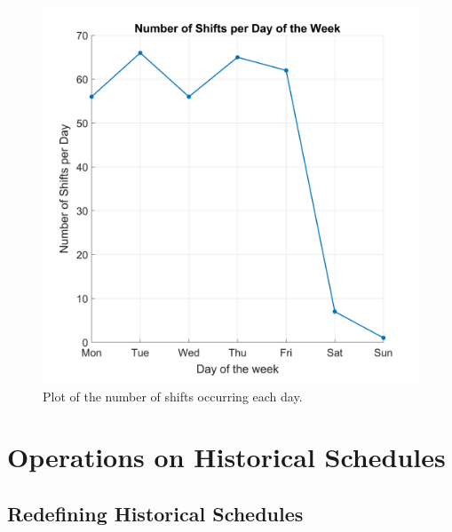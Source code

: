 

\begin{figure}[ht]
\begin{center}
\includegraphics[width=0.46\linewidth]{appendix/shift per day.png}
    
\end{center}
   \caption{Plot of the number of shifts occurring each day.}
\label{fig: Number of shifts per day}
\end{figure}


\chapter{Operations on Historical Schedules}

\section{Redefining Historical Schedules}
\label{subsection: redefine appexnix}

